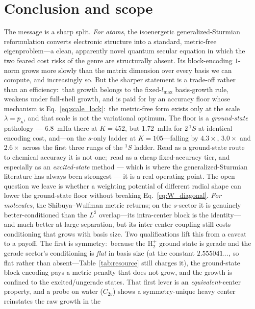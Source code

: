 \documentclass[aps,pra,twocolumn,superscriptaddress,longbibliography]{revtex4-2}
\begin{document}
\section{Conclusion and scope}
\label{sec:conclusion}

The message is a sharp split.  \emph{For atoms}, the isoenergetic
generalized-Sturmian reformulation converts electronic structure into a
standard, metric-free eigenproblem---a clean, apparently novel quantum secular
equation in which the two feared cost risks of the genre are structurally
absent.  Its block-encoding $1$-norm grows more slowly than the matrix
dimension over every basis we can compute, and increasingly so.  But the
sharper statement is a trade-off rather than an efficiency:\ that growth
belongs to the fixed-$l_{\max}$ basis-growth rule, weakens under full-shell
growth, and is paid for by an accuracy floor whose mechanism is
Eq.~\eqref{eq:scale_lock}:\ the metric-free form exists only at the scale
$\lambda=p_\kappa$, and that scale is not the variational optimum.  The floor is
a \emph{ground-state} pathology --- $6.8$~mHa there at $K=452$, but
$1.72$~mHa for $2\,^{1}S$ at identical encoding cost, and---on the $s$-only
ladder at $K=105$---falling by $4.3\times$, $3.0\times$ and $2.6\times$ across
the first three rungs of the $^{1}S$ ladder.  Read as a ground-state route to chemical accuracy it is not
one;\ read as a cheap fixed-accuracy tier, and especially as an
\emph{excited-state} method --- which is where the generalized-Sturmian
literature has always been strongest --- it is a real operating point.  The open
question we leave is whether a weighting potential of different radial shape can
lower the ground-state floor without breaking Eq.~\eqref{eq:W_diagonal}.  \emph{For molecules}, the
Shibuya--Wulfman metric returns; on the $s$-sector it is genuinely better-conditioned than the
$L^2$ overlap---its intra-center block is the identity---and much better at large
separation, but its inter-center coupling still costs conditioning that grows
with basis size.  Two qualifications lift this from a caveat to a payoff.  The first is
symmetry:\ because the $\mathrm{H}_2^+$ ground state is gerade and the gerade
sector's conditioning is \emph{flat} in basis size (at the constant
$2.555041\ldots$, so flat rather than absent---Table~\ref{tab:resource} still
charges it), the ground-state block-encoding pays a metric penalty that does not
grow, and the growth is confined to the excited/ungerade states.  That first
lever is an \emph{equivalent}-center property, and a probe on water ($C_{2v}$)
shows a symmetry-unique heavy center reinstates the raw growth in the
\end{document}
